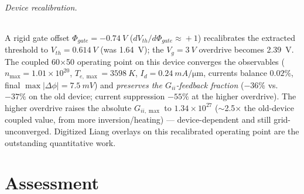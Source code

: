 \documentclass[11pt]{article}
\begin{document}
\paragraph{Device recalibration.} A rigid gate offset $\Phi_{gate}=\SI{-0.74}{V}$
($dV_{th}/d\Phi_{gate}\!\approx\!+1$) recalibrates the extracted threshold to
$V_{th}=\SI{0.614}{V}$ (was \SI{1.64}{V}); the $V_g=\SI{3}{V}$ overdrive becomes \SI{2.39}{V}. The
coupled 60$\times$50 operating point on this device converges the observables
($n_{\max}=1.01\times10^{20}$, $T_{e,\max}=\SI{3598}{K}$, $I_d=\SI{0.24}{mA/\micro\meter}$,
currents balance $0.02\%$, final $\max|\Delta\phi|=\SI{7.5}{mV}$) and \emph{preserves the
$G_{ii}$-feedback fraction} ($-36\%$ vs.\ $-37\%$ on the old device; current suppression $-55\%$
at the higher overdrive). The higher overdrive raises the absolute $G_{ii,\max}$ to
$1.34\times10^{27}$ ($\sim$2.5$\times$ the old-device coupled value, from more inversion/heating)
--- device-dependent and still grid-unconverged. Digitized Liang overlays on this recalibrated
operating point are the outstanding quantitative work.

\part{Assessment}
\end{document}
